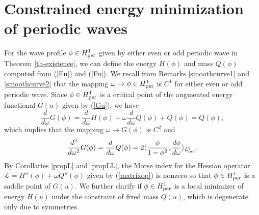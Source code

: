 \documentclass[12pt,reqno]{amsart}
\numberwithin{equation}{section}
\numberwithin{figure}{section}
\begin{document}
		 
\section{Constrained energy minimization of periodic waves}
\label{sec-5}

For the wave profile $\phi \in H^1_{\rm per}$ given by either even or odd periodic wave in Theorem \ref{th-existence}, we can define the energy $H(\phi)$ and mass $Q(\phi)$ computed from (\ref{Eu}) and (\ref{Fu}). We recall from Remarks  \ref{smoothcurve1} and \ref{smoothcurve2} that the mapping $\omega \to \phi \in H^1_{\rm per}$ is $C^1$ for either even or odd periodic wave. Since $\phi \in H^1_{\rm per}$ is a critical point of the augmented energy functional $G(u)$ given by (\ref{Gu}), we have
$$
\frac{d}{d\omega} G(\phi) = \frac{d}{d\omega} H(\phi) + \omega \frac{d}{d\omega} Q(\phi) + Q(\phi) = Q(\phi),
$$
which implies that the mapping $\omega \to G(\phi)$ is $C^2$ and 
$$
\frac{d^2}{d\omega^2} G(\phi) = \frac{d}{d\omega} Q(\phi) = 2 \langle \frac{\phi}{1 - \phi^2}, \frac{d \phi}{d\omega}  \rangle_{L^2_{\rm per}}.
$$
By Corollaries \ref{propL} and \ref{propLL}, the Morse index for the Hessian operator $\mathcal{L} = H''(\phi) + \omega Q''(\phi)$ given by  (\ref{matrixop}) 
is nonzero so that $\phi \in H^1_{\rm per}$ is a saddle point of $G(u)$. We further clarify if $\phi \in H^1_{\rm per}$ is a local minimizer of energy $H(u)$ under the constraint of fixed mass $Q(u)$, which is degenerate only due to symmetries. 
\end{document}
